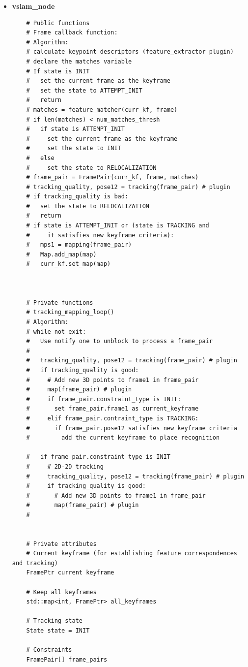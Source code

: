 \begin{itemize}
  \item{\textbf{vslam\_node}} 
  \begin{verbatim}
    # Public functions
    # Frame callback function:
    # Algorithm:
    # calculate keypoint descriptors (feature_extractor plugin)
    # declare the matches variable
    # If state is INIT
    #   set the current frame as the keyframe
    #   set the state to ATTEMPT_INIT
    #   return
    # matches = feature_matcher(curr_kf, frame)
    # if len(matches) < num_matches_thresh
    #   if state is ATTEMPT_INIT
    #     set the current frame as the keyframe
    #     set the state to INIT
    #   else
    #     set the state to RELOCALIZATION
    # frame_pair = FramePair(curr_kf, frame, matches)
    # tracking_quality, pose12 = tracking(frame_pair) # plugin
    # if tracking_quality is bad:
    #   set the state to RELOCALIZATION
    #   return
    # if state is ATTEMPT_INIT or (state is TRACKING and 
    #     it satisfies new keyframe criteria):
    #   mps1 = mapping(frame_pair)
    #   Map.add_map(map) 
    #   curr_kf.set_map(map)

    

    # Private functions
    # tracking_mapping_loop()
    # Algorithm:
    # while not exit:
    #   Use notify one to unblock to process a frame_pair
    #   
    #   tracking_quality, pose12 = tracking(frame_pair) # plugin
    #   if tracking_quality is good:
    #     # Add new 3D points to frame1 in frame_pair
    #     map(frame_pair) # plugin
    #     if frame_pair.constraint_type is INIT:
    #       set frame_pair.frame1 as current_keyframe
    #     elif frame_pair.contraint_type is TRACKING:
    #       if frame_pair.pose12 satisfies new keyframe criteria
    #         add the current keyframe to place recognition

    #   if frame_pair.constraint_type is INIT
    #     # 2D-2D tracking 
    #     tracking_quality, pose12 = tracking(frame_pair) # plugin
    #     if tracking_quality is good:
    #       # Add new 3D points to frame1 in frame_pair
    #       map(frame_pair) # plugin
    #     


    # Private attributes
    # Current keyframe (for establishing feature correspondences and tracking)
    FramePtr current keyframe
    
    # Keep all keyframes
    std::map<int, FramePtr> all_keyframes
    
    # Tracking state
    State state = INIT

    # Constraints
    FramePair[] frame_pairs

  \end{verbatim}
  
\end{itemize}

